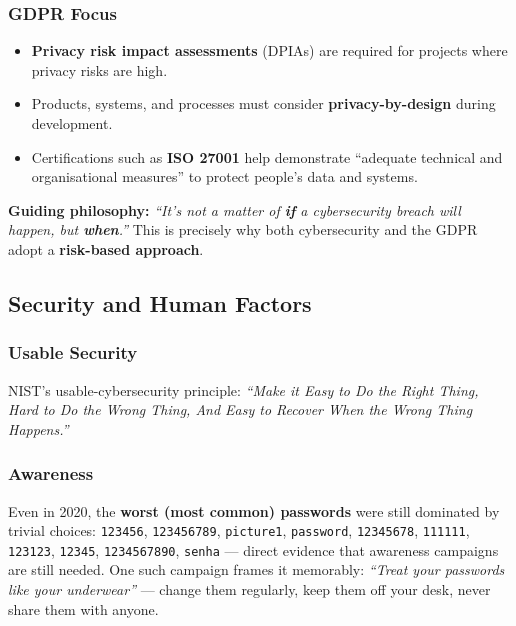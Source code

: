 \documentclass[12pt, a4paper]{article}
\begin{document}
\subsubsection{GDPR Focus}
\begin{itemize}
    \item \textbf{Privacy risk impact assessments} (DPIAs) are required for projects where privacy risks are high.
    \item Products, systems, and processes must consider \textbf{privacy-by-design} during development.
    \item Certifications such as \textbf{ISO 27001} help demonstrate ``adequate technical and organisational measures'' to protect people's data and systems.
\end{itemize}

\textcolor{red!70!black}{\textbf{Guiding philosophy:}} \emph{``It's not a matter of \textbf{if} a cybersecurity breach will happen, but \textbf{when}.''} This is precisely why both cybersecurity and the GDPR adopt a \textbf{risk-based approach}.

\subsection{Security and Human Factors}

\subsubsection{Usable Security}
NIST's usable-cybersecurity principle: \emph{``Make it Easy to Do the Right Thing, Hard to Do the Wrong Thing, And Easy to Recover When the Wrong Thing Happens.''}

\subsubsection{Awareness}
Even in 2020, the \textbf{worst (most common) passwords} were still dominated by trivial choices: \texttt{123456}, \texttt{123456789}, \texttt{picture1}, \texttt{password}, \texttt{12345678}, \texttt{111111}, \texttt{123123}, \texttt{12345}, \texttt{1234567890}, \texttt{senha} — direct evidence that awareness campaigns are still needed. One such campaign frames it memorably: \emph{``Treat your passwords like your underwear''} — change them regularly, keep them off your desk, never share them with anyone.
\end{document}
